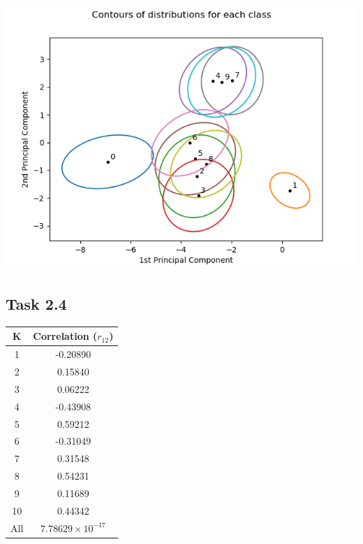 \documentclass{article}
\begin{document}
\begin{center}
    \includegraphics[trim=0 0 0 0, scale=0.55]{images/task2_3_img.png}
\end{center}

\subsection*{Task 2.4}

\begin{tabular}{ |c|c| } 
    \hline
    K & Correlation ($r_{12}$) \\ 
    \hline
   1 & -0.20890 \\
    \hline
   2 & 0.15840  \\
    \hline
   3 & 0.06222  \\
    \hline
   4 & -0.43908 \\
    \hline
   5 & 0.59212 \\
    \hline
   6 & -0.31049 \\
    \hline
   7 & 0.31548 \\
    \hline
   8 & 0.54231 \\
    \hline
   9 & 0.11689 \\
    \hline
   10 & 0.44342 \\
    \hline
   All & $7.78629 \times 10^{-17}$ \\
    \hline
\end{tabular}
\end{document}
